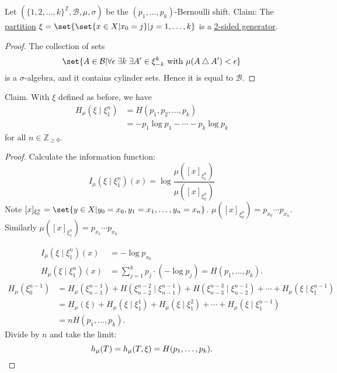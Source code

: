 \documentclass{article}
\newcommand{\sym}{\bigtriangleup}
\begin{document}
\color{gray}
Let $(\{1,2,\dotsc,k\}^\mathbb{Z}, \mathcal{B},\mu,\sigma)$ be the $(p_1, \dotsc, p_k)$-Bernoulli shift.
Claim:
The \hyperlink{def:partition}{partition} $\xi = \set{\set{x \in X | x_0 = j} | j = 1, \dotsc, k}$ is a \hyperlink{def:gen}{2-sided generator}.
\begin{proof}
  The collection of sets
  \begin{equation*}
    \set{A \in \mathcal{B} | \forall \epsilon \; \exists k \; \exists A' \in \xi_{-k}^k \text{ with } \mu(A \sym A') < \epsilon}
  \end{equation*}
  is a $\sigma$-algebra, and it contains cylinder sets. Hence it is equal to $\mathcal{B}$.
\end{proof}
Claim. With $\xi$ defined as before, we have
\begin{align*}
  H_\mu(\xi \mid \xi_1^n) &= H(p_1, p_2, \dotsc, p_k) \\
                          &= -p_1 \log p_1 - \dotsb - p_k \log p_k
\end{align*}
for all $n \in \mathbb{Z}_{\geq 0}$.
\begin{proof}
  Calculate the information function:
  \begin{equation*}
    I_\mu(\xi \mid \xi_1^n)(x) = \log \frac{\mu([x]_{\xi_1^n})}{\mu([x]_{\xi_0^n})}
  \end{equation*}
  Note
  $[x]_{\xi_0^n} = \set{y \in X | y_0 = x_0 , y_1 = x_1, \dotsc, y_n = x_n}$.
  $\mu([x]_{\xi_0^n}) = p_{x_0} \dotsm p_{x_n}$. Similarly $\mu([x]_{\xi_1^n}) = p_{x_1} \dotsm p_{x_n}$

  \begin{align*}
    I_\mu(\xi \mid \xi_1^n)(x) &= -\log p_{x_0} \\
    H_\mu(\xi \mid \xi_1^n)(x) &= \sum_{j=1}^k p_j \cdot (-\log p_j) = H(p_1, \dotsc, p_k).
  \end{align*}
  \begin{align*}
    H_\mu(\xi_0^{n-1}) &= H_\mu(\xi_{n-1}^{n-1}) + H(\xi_{n-2}^{n-2} \mid \xi_{n-1}^{n-1}) + H(\xi_{n-3}^{n-3} \mid \xi_{n-2}^{n-1}) + \dotsb + H_\mu(\xi \mid \xi_1^{n-1}) \\
                       &= H_\mu(\xi) + H_\mu(\xi \mid \xi_1^1) + H_\mu(\xi \mid \xi_1^2) + \dotsb + H_\mu(\xi \mid \xi_1^{n-1}) \\
                       &= n H(p_1, \dotsc, p_k).
  \end{align*}
  Divide by $n$ and take the limit:
  \begin{equation*}
    h_\mu(T) = h_\mu(T, \xi) = H(p_1, \dotsc, p_k). \qedhere
  \end{equation*}
\end{proof}
\end{document}
